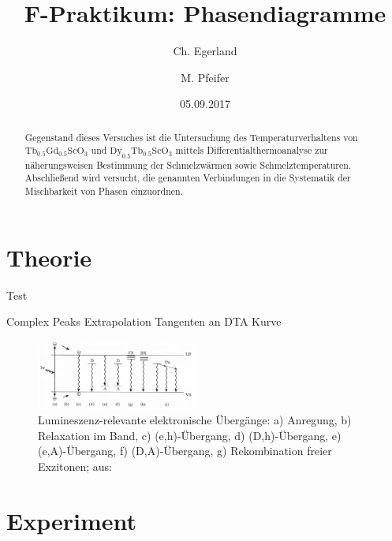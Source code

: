 \documentclass[aps,twocolumn,secnumarabic,nobalancelastpage,amsmath,amssymb,
nofootinbib,superscriptaddress]{revtex4-1}
\begin{document}
\title{F-Praktikum: Phasendiagramme}
\author         {Ch. Egerland}
\author         {M. Pfeifer}
\date[Versuchsdatum: ]{05.09.2017}

\begin{abstract}
Gegenstand dieses Versuches ist die Untersuchung des Temperaturverhaltens von $\text{Tb}_{0.5}\text{Gd}_{0.5}\text{ScO}_3$ und
$\text{Dy}_{0.5}\text{Tb}_{0.5}\text{ScO}_3$ mittels Differentialthermoanalyse zur näherungsweisen Bestimmung der Schmelzwärmen sowie Schmelztemperaturen.
Abschließend wird versucht, die genannten Verbindungen in die Systematik der Mischbarkeit von Phasen einzuordnen.
\end{abstract}


\maketitle



\section{Theorie}

\noindent Test
 
Complex Peaks Extrapolation Tangenten an DTA Kurve

\begin{figure}[h]
  \centering
  \includegraphics[width=0.47\textwidth]{img/rekombinationswege.jpg}
  \caption{ Lumineszenz-relevante elektronische Übergänge: a) Anregung, b) Relaxation im Band,
  c) (e,h)-Übergang, d) (D,h)-Übergang, e) (e,A)-Übergang, f) (D,A)-Übergang, g) Rekombination freier Exzitonen; aus: \cite{saarland}}
  \label{fig:rekomb}
\end{figure}



\section{Experiment}
\end{document}
